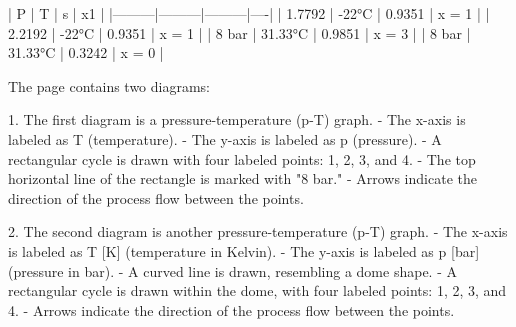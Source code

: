| P       | T       | s       | x1 |  
|---------|---------|---------|----|  
| 1.7792  | -22°C   | 0.9351  | x = 1 |  
| 2.2192  | -22°C   | 0.9351  | x = 1 |  
| 8 bar   | 31.33°C | 0.9851  | x = 3 |  
| 8 bar   | 31.33°C | 0.3242  | x = 0 |

The page contains two diagrams:

1. The first diagram is a pressure-temperature (p-T) graph.  
   - The x-axis is labeled as T (temperature).  
   - The y-axis is labeled as p (pressure).  
   - A rectangular cycle is drawn with four labeled points: 1, 2, 3, and 4.  
   - The top horizontal line of the rectangle is marked with "8 bar."  
   - Arrows indicate the direction of the process flow between the points.

2. The second diagram is another pressure-temperature (p-T) graph.  
   - The x-axis is labeled as T [K] (temperature in Kelvin).  
   - The y-axis is labeled as p [bar] (pressure in bar).  
   - A curved line is drawn, resembling a dome shape.  
   - A rectangular cycle is drawn within the dome, with four labeled points: 1, 2, 3, and 4.  
   - Arrows indicate the direction of the process flow between the points.